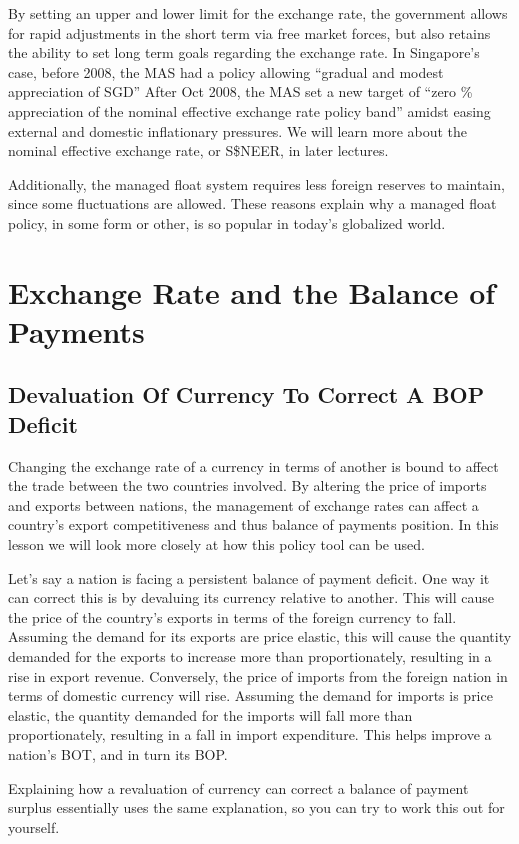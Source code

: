 \documentclass[DIV=calc,11pt,parskip,numbers=noenddot]{scrartcl} %
\begin{document}
By setting an upper and lower limit for the exchange rate, the government allows for rapid adjustments in the short term via free market forces, but also retains the ability to set long term goals regarding the exchange rate. In Singapore’s case, before 2008, the MAS had a policy allowing “gradual and modest appreciation of SGD” After Oct 2008, the MAS set a new target of “zero \% appreciation of the nominal effective exchange rate policy band” amidst easing external and domestic inflationary pressures. We will learn more about the nominal effective exchange rate, or S\$NEER, in later lectures.

Additionally, the managed float system requires less foreign reserves to maintain, since some fluctuations are allowed. These reasons explain why a managed float policy, in some form or other, is so popular in today’s globalized world.
\newpage
\section{Exchange Rate and the Balance of Payments}
\subsection{Devaluation Of Currency To Correct A BOP Deficit}
Changing the exchange rate of a currency in terms of another is bound to affect the trade between the two countries involved. By altering the price of imports and exports between nations, the management of exchange rates can affect a country’s export competitiveness and thus balance of payments position. In this lesson we will look more closely at how this policy tool can be used.

Let’s say a nation is facing a persistent balance of payment deficit. One way it can correct this is by devaluing its currency relative to another. This will cause the price of the country’s exports in terms of the foreign currency to fall. Assuming the demand for its exports are price elastic, this will cause the quantity demanded for the exports to increase more than proportionately, resulting in a rise in export revenue. Conversely, the price of imports from the foreign nation in terms of domestic currency will rise. Assuming the demand for imports is price elastic, the quantity demanded for the imports will fall more than proportionately, resulting in a fall in import expenditure. This helps improve a nation’s BOT, and in turn its BOP.

Explaining how a revaluation of currency can correct a balance of payment surplus essentially uses the same explanation, so you can try to work this out for yourself.
\end{document}
